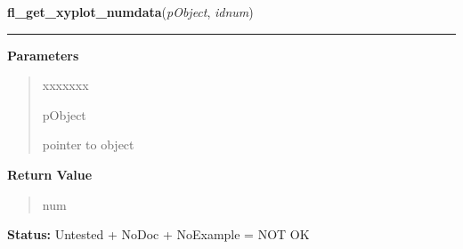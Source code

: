 \hspace{.8\funcindent}\begin{boxedminipage}{\funcwidth}

    \raggedright \textbf{fl\_get\_xyplot\_numdata}(\textit{pObject}, \textit{idnum})

    \vspace{-1.5ex}

    \rule{\textwidth}{0.5\fboxrule}
\setlength{\parskip}{2ex}
\setlength{\parskip}{1ex}
      \textbf{Parameters}
      \vspace{-1ex}

      \begin{quote}
        \begin{Ventry}{xxxxxxx}

          \item[pObject]

          pointer to object

        \end{Ventry}

      \end{quote}

      \textbf{Return Value}
    \vspace{-1ex}

      \begin{quote}
      num

      \end{quote}

\textbf{Status:} Untested + NoDoc + NoExample = NOT OK



    \end{boxedminipage}

    \label{xformslib:library:fl_xyplot_s2w}

    \vspace{0.5ex}

